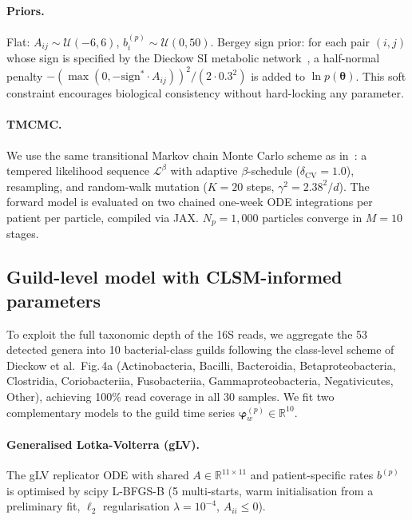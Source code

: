 \documentclass[11pt,a4paper]{article}
\newcommand{\btheta}{\boldsymbol{\theta}}
\newcommand{\bvarphi}{\boldsymbol{\varphi}}
\begin{document}
\paragraph{Priors.}
Flat: $A_{ij}\sim\mathcal{U}(-6,6)$, $b_i^{(p)}\sim\mathcal{U}(0,50)$.
Bergey sign prior: for each pair $(i,j)$ whose sign is specified by the Dieckow SI metabolic network~\cite{Dieckow2025InVivo}, a half-normal penalty $-(\max(0, -\mathrm{sign}^*\cdot A_{ij}))^2/(2\cdot 0.3^2)$ is added to $\ln p(\btheta)$.
This soft constraint encourages biological consistency without hard-locking any parameter.

\paragraph{TMCMC.}
We use the same transitional Markov chain Monte Carlo scheme as in~\cite{NishiokaTMCMC2025,ChingChen2007TMCMC,Betz2016TMCMC}: a tempered likelihood sequence $\mathcal{L}^\beta$ with adaptive $\beta$-schedule ($\delta_{\mathrm{CV}}=1.0$), resampling, and random-walk mutation ($K=20$ steps, $\gamma^2=2.38^2/d$).
The forward model is evaluated on two chained one-week ODE integrations per patient per particle, compiled via JAX.
$N_p=1{,}000$ particles converge in $M=10$ stages.

\subsection{Guild-level model with CLSM-informed parameters}
\label{sec:guild_methods}

To exploit the full taxonomic depth of the 16S reads, we aggregate the 53 detected genera into 10 bacterial-class guilds following the class-level scheme of Dieckow et al.\ Fig.\,4a (Actinobacteria, Bacilli, Bacteroidia, Betaproteobacteria, Clostridia, Coriobacteriia, Fusobacteriia, Gammaproteobacteria, Negativicutes, Other), achieving 100\% read coverage in all 30 samples.
We fit two complementary models to the guild time series $\bvarphi^{(p)}_w\in\mathbb{R}^{10}$.

\paragraph{Generalised Lotka-Volterra (gLV).}
The gLV replicator ODE with shared $A\in\mathbb{R}^{11\times11}$ and patient-specific rates $b^{(p)}$ is optimised by scipy L-BFGS-B (5 multi-starts, warm initialisation from a preliminary fit, $\ell_2$ regularisation $\lambda=10^{-4}$, $A_{ii}\le0$).
\end{document}
